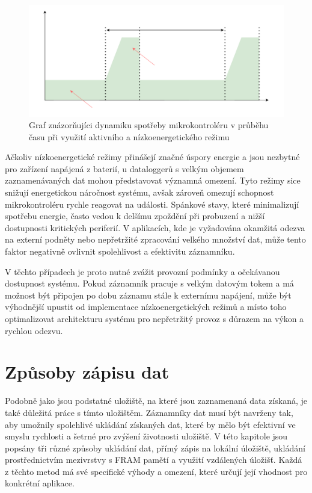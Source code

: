 \begin{figure}[h]
    \centering
    \includegraphics[width=1.00\textwidth]{obrazky-figures/low_power_modes-cz.pdf}
    
    \caption{Graf znázorňujíci dynamiku spotřeby mikrokontroléru v průběhu času při využití aktivního a nízkoenergetického režimu}
    \label{fig:low-power-modes}
\end{figure}

Ačkoliv nízkoenergetické režimy přinášejí značné úspory energie a jsou nezbytné pro zařízení napájená z baterií, u dataloggerů s velkým objemem zaznamenávaných dat mohou představovat významná omezení. Tyto režimy sice snižují energetickou náročnost systému, avšak zároveň omezují schopnost mikrokontroléru rychle reagovat na události. Spánkové stavy, které minimalizují spotřebu energie, často vedou k delšímu zpoždění při probuzení a nižší dostupnosti kritických periferií. V aplikacích, kde je vyžadována okamžitá odezva na externí podněty nebo nepřetržité zpracování velkého množství dat, může tento faktor negativně ovlivnit spolehlivost a efektivitu záznamníku. \cite{embedded_low_power_modes}

V těchto případech je proto nutné zvážit provozní podmínky a očekávanou dostupnost systému. Pokud záznamník pracuje s velkým datovým tokem a má možnost být připojen po dobu záznamu stále k externímu napájení, může být výhodnější upustit od implementace nízkoenergetických režimů a místo toho optimalizovat architekturu systému pro nepřetržitý provoz s důrazem na výkon a rychlou odezvu. \cite{analog_devices_low_power_modes}


\section{Způsoby zápisu dat}
Podobně jako jsou podstatné uložiště, na které jsou zaznamenaná data získaná, je také důležitá práce s tímto uložištěm. Záznamníky dat musí být navrženy tak, aby umožnily spolehlivé ukládání získaných dat, které by mělo být efektivní ve smyslu rychlosti a šetrné pro zvýšení životnosti uložiště. V této kapitole jsou popsány tři různé způsoby ukládání dat, přímý zápis na lokální úložiště, ukládání prostřednictvím mezivrstvy s FRAM pamětí a využití vzdálených úložišť. Každá z těchto metod má své specifické výhody a omezení, které určují její vhodnost pro konkrétní aplikace.

